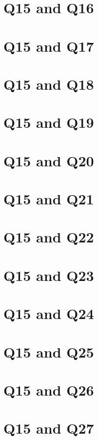 \documentclass{report}
\begin{document}
\section{Q15 and Q16}\clearpage
\section{Q15 and Q17}\clearpage
\section{Q15 and Q18}\clearpage
\section{Q15 and Q19}\clearpage
\section{Q15 and Q20}\clearpage
\section{Q15 and Q21}\clearpage
\section{Q15 and Q22}\clearpage
\section{Q15 and Q23}\clearpage
\section{Q15 and Q24}\clearpage
\section{Q15 and Q25}\clearpage
\section{Q15 and Q26}\clearpage
\section{Q15 and Q27}\clearpage
\end{document}
